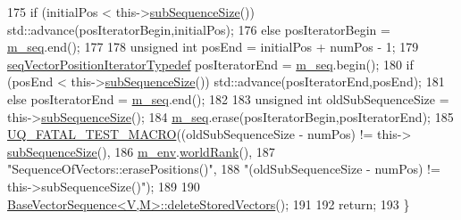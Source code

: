 \begin{DoxyCode}
175   \textcolor{keywordflow}{if} (initialPos < this->\hyperlink{class_q_u_e_s_o_1_1_sequence_of_vectors_a0224bd3e961d86af5d2886301c0c2b86}{subSequenceSize}()) std::advance(posIteratorBegin,initialPos);
176   \textcolor{keywordflow}{else}                                      posIteratorBegin = \hyperlink{class_q_u_e_s_o_1_1_sequence_of_vectors_ae83e7c53439265667809256d0d302e5b}{m\_seq}.end();
177 
178   \textcolor{keywordtype}{unsigned} \textcolor{keywordtype}{int} posEnd = initialPos + numPos - 1;
179   \hyperlink{class_q_u_e_s_o_1_1_sequence_of_vectors_ac33b1b9b3f22325b49618a6591dce818}{seqVectorPositionIteratorTypedef} posIteratorEnd = 
      \hyperlink{class_q_u_e_s_o_1_1_sequence_of_vectors_ae83e7c53439265667809256d0d302e5b}{m\_seq}.begin();
180   \textcolor{keywordflow}{if} (posEnd < this->\hyperlink{class_q_u_e_s_o_1_1_sequence_of_vectors_a0224bd3e961d86af5d2886301c0c2b86}{subSequenceSize}()) std::advance(posIteratorEnd,posEnd);
181   \textcolor{keywordflow}{else}                                  posIteratorEnd = \hyperlink{class_q_u_e_s_o_1_1_sequence_of_vectors_ae83e7c53439265667809256d0d302e5b}{m\_seq}.end();
182 
183   \textcolor{keywordtype}{unsigned} \textcolor{keywordtype}{int} oldSubSequenceSize = this->\hyperlink{class_q_u_e_s_o_1_1_sequence_of_vectors_a0224bd3e961d86af5d2886301c0c2b86}{subSequenceSize}();
184   \hyperlink{class_q_u_e_s_o_1_1_sequence_of_vectors_ae83e7c53439265667809256d0d302e5b}{m\_seq}.erase(posIteratorBegin,posIteratorEnd);
185   \hyperlink{_defines_8h_a56d63d18d0a6d45757de47fcc06f574d}{UQ\_FATAL\_TEST\_MACRO}((oldSubSequenceSize - numPos) != this->
      \hyperlink{class_q_u_e_s_o_1_1_sequence_of_vectors_a0224bd3e961d86af5d2886301c0c2b86}{subSequenceSize}(),
186                       \hyperlink{class_q_u_e_s_o_1_1_base_vector_sequence_a8e8824d2a63c5a43bcc6473e3a0491e8}{m\_env}.\hyperlink{class_q_u_e_s_o_1_1_base_environment_a78b57112bbd0e6dd0e8afec00b40ffa7}{worldRank}(),
187                       \textcolor{stringliteral}{"SequenceOfVectors::erasePositions()"},
188                       \textcolor{stringliteral}{"(oldSubSequenceSize - numPos) != this->subSequenceSize()"});
189 
190   \hyperlink{class_q_u_e_s_o_1_1_base_vector_sequence_a5609e02046ba555f0eebe49c6c231faf}{BaseVectorSequence<V,M>::deleteStoredVectors}();
191 
192   \textcolor{keywordflow}{return};
193 \}
\end{DoxyCode}
